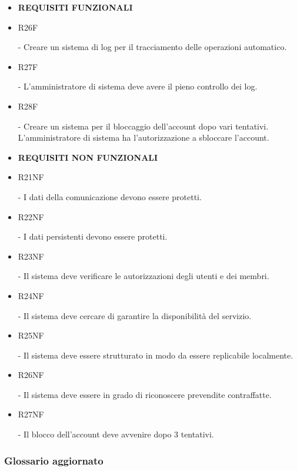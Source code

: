 \documentclass[a4paper]{article}
\begin{document}
\begin{itemize}
    \item \textbf{REQUISITI FUNZIONALI}
    
    \item \hypertarget{R26F}{R26F} - Creare un sistema di log per il tracciamento delle operazioni automatico.
    \item \hypertarget{R27F}{R27F} - L'amministratore di sistema deve avere il pieno controllo dei log.
    \item \hypertarget{R28F}{R28F} - Creare un sistema per il bloccaggio dell'account dopo vari tentativi. L'amministratore di sistema ha l'autorizzazione a sbloccare l'account.
    
    \item \textbf{REQUISITI NON FUNZIONALI}
    
    \item \hypertarget{R21NF}{R21NF} - I dati della comunicazione devono essere protetti.
    \item \hypertarget{R22NF}{R22NF} - I dati persistenti devono essere protetti.
    \item \hypertarget{R23NF}{R23NF} - Il sistema deve verificare le autorizzazioni degli utenti e dei membri.
    \item \hypertarget{R24NF}{R24NF} - Il sistema deve cercare di garantire la disponibilità del servizio.
    \item \hypertarget{R25NF}{R25NF} - Il sistema deve essere strutturato in modo da essere replicabile localmente.
    \item \hypertarget{R26NF}{R26NF} - Il sistema deve essere in grado di riconoscere prevendite contraffatte.
    \item \hypertarget{R27NF}{R27NF} - Il blocco dell'account deve avvenire dopo 3 tentativi.
    
\end{itemize}

\subsubsection{Glossario aggiornato}
\end{document}
